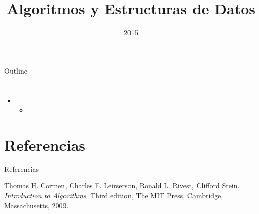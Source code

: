 \documentclass[aspectratio=169]{beamer}
\title{Algoritmos y Estructuras de Datos}
\subtitle{}
\date{2015}
\institute{\href{http://www.upc.edu.pe}{Universidad Peruana de Ciencias Aplicadas}}
\begin{document}
\maketitle

\begin{frame}{Outline}
  \tableofcontents
\end{frame}

\section{}
\subsection{}

\begin{frame}{}
  \begin{itemize}
    \item 
    \begin{itemize}
      \item 
    \end{itemize}
  \end{itemize}
\end{frame}

\section{Referencias}
\begin{frame}{Referencias}
  \begin{thebibliography}{9}
    Thomas H. Cormen, Charles E. Leirserson, Ronald L. Rivest, Clifford Stein.
    \textit{Introduction to Algorithms}. Third edition, The MIT Press, Cambridge, Massachusetts, 2009.
  \end{thebibliography}
\end{frame}
\end{document}
